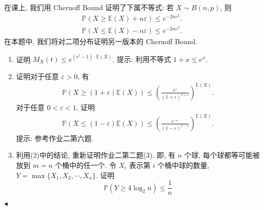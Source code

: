 \documentclass[11pt]{article}
\newenvironment{problem}[2][Problem]{\begin{trivlist}
    \item[\hskip \labelsep {\bfseries #1}\hskip \labelsep {\bfseries #2.}]\songti}{\hfill$\blacktriangleleft$\end{trivlist}}
\newcommand\1{\mathds{1}}
\newcommand\E{\mathbb{E}}
\newcommand\PP{\mathbb{P}}
\begin{document}
\begin{problem}{4}
    在课上, 我们用 Chernoff Bound 证明了下属不等式: 若 $X\sim B(n,p)$, 则
    \begin{align*}
        \PP(X\ge \E(X) + n\varepsilon) \le e^{-2n\varepsilon^2}. \\
        \PP(X\le \E(X) - n\varepsilon) \le e^{-2n\varepsilon^2}.
    \end{align*}
    在本题中, 我们将对二项分布证明另一版本的 Chernoff Bound.
    \begin{enumerate}[label=(\arabic*)]
        \item 证明 $M_X(t) \le e^{(e^t - 1)\cdot \E(X)}$. {\kaishu 提示: 利用不等式 $1+x\le e^x$}.
        \item 证明对于任意 $\varepsilon >0$, 有
        \begin{align*}
            \PP(X\ge (1+ \varepsilon)\E(X)) \le \left(\frac{e^{\varepsilon}}{(1+\varepsilon)^{1+\varepsilon}}\right)^{\E(X)}.
        \end{align*}
        对于任意 $0 < \varepsilon < 1$, 证明
        \begin{align*}
            \PP(X\le (1- \varepsilon)\E(X)) \le \left(\frac{e^{-\varepsilon}}{(1-\varepsilon)^{1-\varepsilon}}\right)^{\E(X)}.
        \end{align*}
        {\kaishu 提示: 参考作业二第六题.}
        \item 利用(2)中的结论, 重新证明作业二第二题(3). 即, 有 $n$ 个球, 每个球都等可能被放到 $m=n$ 个桶中的任一个. 
        令 $X_i$ 表示第 $i$ 个桶中球的数量, $Y = \max\{X_1, X_2,\cdots, X_n\}$. 证明
        \[
            \PP(Y\ge 4\log_2 n) \le \frac{1}{n}
        \]
    \end{enumerate}
\end{problem}
\end{document}
